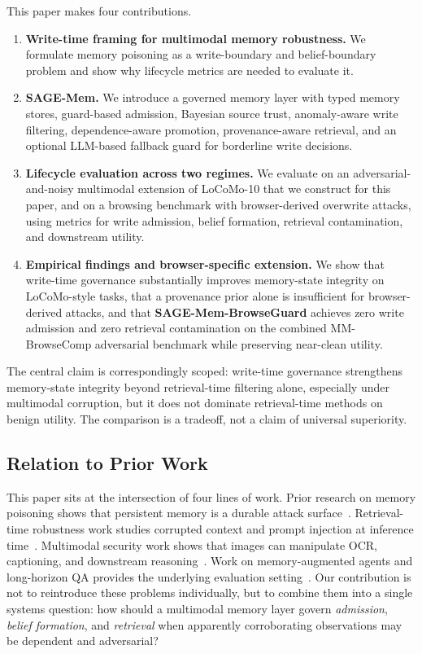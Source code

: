 \documentclass{article}
\begin{document}
This paper makes four contributions.

\begin{enumerate}
\item \textbf{Write-time framing for multimodal memory robustness.} We formulate memory poisoning as a write-boundary and belief-boundary problem and show why lifecycle metrics are needed to evaluate it.
\item \textbf{SAGE-Mem.} We introduce a governed memory layer with typed memory stores, guard-based admission, Bayesian source trust, anomaly-aware write filtering, dependence-aware promotion, provenance-aware retrieval, and an optional LLM-based fallback guard for borderline write decisions.
\item \textbf{Lifecycle evaluation across two regimes.} We evaluate on an adversarial-and-noisy multimodal extension of LoCoMo-10 that we construct for this paper, and on a browsing benchmark with browser-derived overwrite attacks, using metrics for write admission, belief formation, retrieval contamination, and downstream utility.
\item \textbf{Empirical findings and browser-specific extension.} We show that write-time governance substantially improves memory-state integrity on LoCoMo-style tasks, that a provenance prior alone is insufficient for browser-derived attacks, and that \textbf{SAGE-Mem-BrowseGuard} achieves zero write admission and zero retrieval contamination on the combined MM-BrowseComp adversarial benchmark while preserving near-clean utility.
\end{enumerate}

The central claim is correspondingly scoped: write-time governance strengthens memory-state integrity beyond retrieval-time filtering alone, especially under multimodal corruption, but it does not dominate retrieval-time methods on benign utility. The comparison is a tradeoff, not a claim of universal superiority.

\subsection{Relation to Prior Work}

This paper sits at the intersection of four lines of work. Prior research on memory poisoning shows that persistent memory is a durable attack surface~\cite{ref1,ref2,ref3}. Retrieval-time robustness work studies corrupted context and prompt injection at inference time~\cite{ref4,ref5,ref6,ref7}. Multimodal security work shows that images can manipulate OCR, captioning, and downstream reasoning~\cite{ref8}. Work on memory-augmented agents and long-horizon QA provides the underlying evaluation setting~\cite{ref9,ref10,ref11}. Our contribution is not to reintroduce these problems individually, but to combine them into a single systems question: how should a multimodal memory layer govern \emph{admission}, \emph{belief formation}, and \emph{retrieval} when apparently corroborating observations may be dependent and adversarial?
\end{document}
